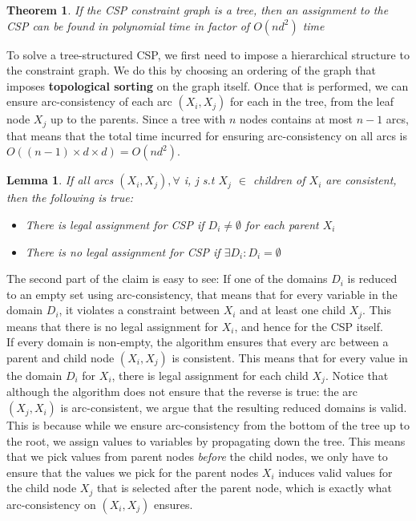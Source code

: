 \documentclass[12pt]{article}
\newtheorem{theorem}{Theorem}
\newtheorem{lemma}{Lemma}
\begin{document}
\begin{theorem}
If the CSP constraint graph is a tree, then an assignment to the CSP can be found in polynomial time in factor of $O(nd^2)$ time
\end{theorem}

To solve a tree-structured CSP, we first need to impose a hierarchical structure to the constraint graph. We do this by choosing an ordering of the graph that imposes \textbf{topological sorting} on the graph itself. Once that is performed, we can ensure arc-consistency of each arc $(X_i, X_j)$ for each in the tree, from the leaf node $X_j$ up to the parents. Since a tree with $n$ nodes contains at most $n-1$ arcs, that means that the total time incurred for ensuring arc-consistency on all arcs is $O((n-1) \times d \times d) = O(nd^2)$.\\

\begin{lemma}
If all arcs $(X_i, X_j), \forall$ i, j s.t $X_j$ $\in$ children of $X_i$ are consistent, then the following is true:

\begin{itemize}
\item There is legal assignment for CSP if $D_i  \neq \emptyset$ for each parent $X_i$ 
\item There is no legal assignment for CSP if $\exists D_i : D_i = \emptyset$
\end{itemize}
\end{lemma}

The second part of the claim is easy to see: If one of the domains $D_i$ is reduced to an empty set using arc-consistency, that means that for every variable in the domain $D_i$, it violates a constraint between $X_i$ and at least one child $X_j$. This means that there is no legal assignment for $X_i$, and hence for the CSP itself.\\

If every domain is non-empty, the algorithm ensures that every arc between a parent and child node $(X_i, X_j)$ is consistent. This means that for every value in the domain $D_i$ for $X_i$, there is legal assignment for each child $X_j$. Notice that although the algorithm does not ensure that the reverse is true: the arc $(X_j, X_i)$ is arc-consistent, we argue that the resulting reduced domains is valid. This is because while we ensure arc-consistency from the bottom of the tree up to the root, we assign values to variables by propagating down the tree. This means that we pick values from parent nodes \textit{before} the child nodes, we only have to ensure that the values we pick for the parent nodes $X_i$ induces valid values for the child node $X_j$ that is selected after the parent node, which is exactly what arc-consistency on $(X_i, X_j)$ ensures. \\
\end{document}

